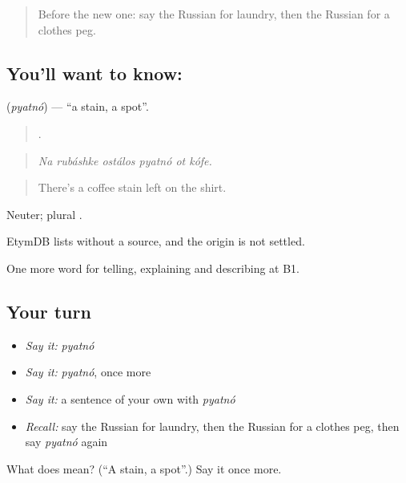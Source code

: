 \begin{quote}
Before the new one: say the Russian for laundry, then the Russian for a clothes peg.
\end{quote}

\subsection*{You'll want to know: }
\textbf{} (\emph{pyatnó}) — \textquotedblleft{}a stain, a spot\textquotedblright{}.

\begin{quote}
     .
\end{quote}

\begin{quote}
\emph{Na rubáshke ostálos pyatnó ot kófe.}
\end{quote}

\begin{quote}
There's a coffee stain left on the shirt.
\end{quote}

Neuter; plural .

\begin{cousinweb}
EtymDB lists \emph{} without a source, and the origin is not settled.
\end{cousinweb}

\begin{grammarlens}[title={What you've built}]
One more word for telling, explaining and describing at B1.
\end{grammarlens}

\subsection*{Your turn}
\begin{itemize}
\raggedright
  \item \emph{Say it:} \emph{pyatnó}
  \item \emph{Say it:} \emph{pyatnó}, once more
  \item \emph{Say it:} a sentence of your own with \emph{pyatnó}
  \item \emph{Recall:} say the Russian for laundry, then the Russian for a clothes peg, then say \emph{pyatnó} again
\end{itemize}

\begin{tcolorbox}[breakable,colback=teal!4,colframe=teal!35!black,title={Before you move on}]
What does  mean? (\textquotedblleft{}A stain, a spot\textquotedblright{}.) Say it once more.
\end{tcolorbox}
